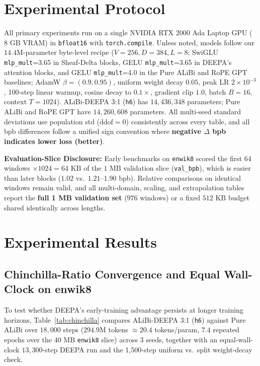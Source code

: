 \documentclass[10pt,a4paper]{article}
\begin{document}
\section{Experimental Protocol}

All primary experiments run on a single NVIDIA RTX 2000 Ada Laptop GPU ($8\text{ GB}$ VRAM) in \texttt{bfloat16} with \texttt{torch.compile}. Unless noted, models follow our $14.4\text{M}$-parameter byte-level recipe ($V=256, D=384, L=8$; SwiGLU \texttt{mlp\_mult}=3.65 in Sheaf-Delta blocks, GELU \texttt{mlp\_mult}=3.65 in DEEPA's attention blocks, and GELU \texttt{mlp\_mult}=4.0 in the Pure ALiBi and RoPE GPT baselines; AdamW $\beta=(0.9,0.95)$, uniform weight decay $0.05$, peak LR $2\times 10^{-3}$, 100-step linear warmup, cosine decay to $0.1\times$, gradient clip $1.0$, batch $B=16$, context $T=1024$). ALiBi-DEEPA 3:1 (\texttt{h6}) has $14,436,348$ parameters; Pure ALiBi and RoPE GPT have $14,260,608$ parameters. All multi-seed standard deviations use population std ($\text{ddof}=0$) consistently across every table, and all bpb differences follow a unified sign convention where \textbf{negative $\Delta$ bpb indicates lower loss (better)}.

\noindent\textbf{Evaluation-Slice Disclosure:} Early benchmarks on \texttt{enwik8} scored the first $64$ windows $\times 1024 = 64\text{ KB}$ of the $1\text{ MB}$ validation slice (\texttt{val\_bpb}), which is easier than later blocks ($1.02$ vs.\ $1.21\text{--}1.90$ bpb). Relative comparisons on identical windows remain valid, and all multi-domain, scaling, and extrapolation tables report the \textbf{full 1 MB validation set} ($976$ windows) or a fixed $512\text{ KB}$ budget shared identically across lengths.

\section{Experimental Results}

\subsection{Chinchilla-Ratio Convergence and Equal Wall-Clock on enwik8}
To test whether DEEPA's early-training advantage persists at longer training horizons, Table~\ref{tab:chinchilla} compares ALiBi-DEEPA 3:1 (\texttt{h6}) against Pure ALiBi over $18,000$ steps ($294.9\text{M}$ tokens $\approx 20.4$ tokens/param, $7.4$ repeated epochs over the $40\text{ MB}$ \texttt{enwik8} slice) across 3 seeds, together with an equal-wall-clock $13{,}300$-step DEEPA run and the 1,500-step uniform vs.\ split weight-decay check.
\end{document}
